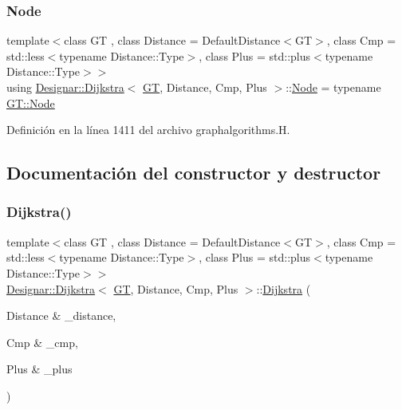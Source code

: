 \subsubsection{\texorpdfstring{Node}{Node}}
{\footnotesize\ttfamily template$<$class GT , class Distance  = Default\+Distance$<$\+G\+T$>$, class Cmp  = std\+::less$<$typename Distance\+::\+Type$>$, class Plus  = std\+::plus$<$typename Distance\+::\+Type$>$$>$ \\
using \hyperlink{class_designar_1_1_dijkstra}{Designar\+::\+Dijkstra}$<$ \hyperlink{demo-buildgraph_8_c_a3001c40d2c31ca87ed96cd7d1334a55e}{GT}, Distance, Cmp, Plus $>$\+::\hyperlink{class_designar_1_1_dijkstra_afeb644fc5395569ec366f0d220ab477d}{Node} =  typename \hyperlink{class_designar_1_1_graph_a5dfc7dba9d092ac489c72e40390c37d0}{G\+T\+::\+Node}}



Definición en la línea 1411 del archivo graphalgorithms.\+H.



\subsection{Documentación del constructor y destructor}
\mbox{\label{class_designar_1_1_dijkstra_ada4a9a8403304341114425e296c5ed26}} 
\subsubsection{\texorpdfstring{Dijkstra()}{Dijkstra()}\hspace{0.1cm}{\footnotesize\ttfamily [1/2]}}
{\footnotesize\ttfamily template$<$class GT , class Distance  = Default\+Distance$<$\+G\+T$>$, class Cmp  = std\+::less$<$typename Distance\+::\+Type$>$, class Plus  = std\+::plus$<$typename Distance\+::\+Type$>$$>$ \\
\hyperlink{class_designar_1_1_dijkstra}{Designar\+::\+Dijkstra}$<$ \hyperlink{demo-buildgraph_8_c_a3001c40d2c31ca87ed96cd7d1334a55e}{GT}, Distance, Cmp, Plus $>$\+::\hyperlink{class_designar_1_1_dijkstra}{Dijkstra} (\begin{DoxyParamCaption}\item[{Distance \&}]{\+\_\+distance,  }\item[{Cmp \&}]{\+\_\+cmp,  }\item[{Plus \&}]{\+\_\+plus }\end{DoxyParamCaption})\hspace{0.3cm}{\ttfamily [inline]}}



